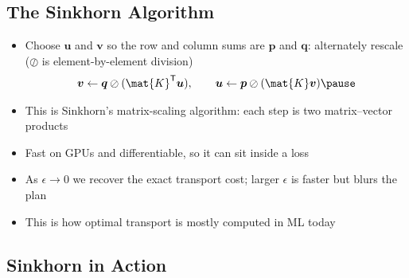 \begin{slide}
\section[-1]{The Sinkhorn Algorithm}

\begin{PauseHighLight}
  \begin{itemize}\squeeze
  \item Choose $\bm{u}$ and $\bm{v}$ so the row and column sums are $\bm{p}$
    and $\bm{q}$: alternately rescale ($\oslash$ is element-by-element
    division)
    \begin{align*}
      \bm{v} \leftarrow \bm{q}\oslash(\mat{K}^\tr\bm{u}), \qquad
      \bm{u} \leftarrow \bm{p}\oslash(\mat{K}\bm{v})\pause
    \end{align*}
  \item This is Sinkhorn's matrix-scaling algorithm: each step is
    two matrix--vector products\pause
  \item Fast on GPUs and differentiable, so it can sit inside a loss\pause
  \item As $\epsilon\to0$ we recover the exact transport cost; larger
    $\epsilon$ is faster but blurs the plan\pause
  \item This is how optimal transport is mostly computed in ML today\pause
  \end{itemize}
\end{PauseHighLight}

\end{slide}


\begin{slide}
\section[-2]{Sinkhorn in Action}

\pb
\pause{}
\begin{center}
  \pause
\end{center}
\end{slide}


